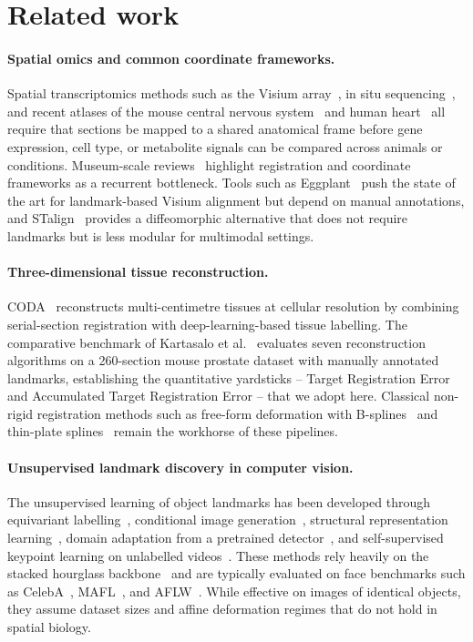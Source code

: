 \section{Related work}

\paragraph{Spatial omics and common coordinate frameworks.} Spatial transcriptomics methods such as the Visium array~\cite{stahl2016visualization}, in situ sequencing~\cite{ke2013insitu}, and recent atlases of the mouse central nervous system~\cite{chen2023atlas} and human heart~\cite{asp2019spatiotemporal} all require that sections be mapped to a shared anatomical frame before gene expression, cell type, or metabolite signals can be compared across animals or conditions. Museum-scale reviews~\cite{moses2022museum,marx2021method} highlight registration and coordinate frameworks as a recurrent bottleneck. Tools such as Eggplant~\cite{bergenstrahle2021eggplant} push the state of the art for landmark-based Visium alignment but depend on manual annotations, and STalign~\cite{clifton2023stalign} provides a diffeomorphic alternative that does not require landmarks but is less modular for multimodal settings.

\paragraph{Three-dimensional tissue reconstruction.} CODA~\cite{kiemen2022coda} reconstructs multi-centimetre tissues at cellular resolution by combining serial-section registration with deep-learning-based tissue labelling. The comparative benchmark of Kartasalo et al.~\cite{kartasalo2018comparative} evaluates seven reconstruction algorithms on a 260-section mouse prostate dataset with manually annotated landmarks, establishing the quantitative yardsticks -- Target Registration Error and Accumulated Target Registration Error -- that we adopt here. Classical non-rigid registration methods such as free-form deformation with B-splines~\cite{rueckert1999nonrigid} and thin-plate splines~\cite{bookstein1989principal} remain the workhorse of these pipelines.

\paragraph{Unsupervised landmark discovery in computer vision.} The unsupervised learning of object landmarks has been developed through equivariant labelling~\cite{thewlis2017unsupervised}, conditional image generation~\cite{jakab2018conditional}, structural representation learning~\cite{zhang2018unsupervised}, domain adaptation from a pretrained detector~\cite{sanchez2019object}, and self-supervised keypoint learning on unlabelled videos~\cite{jakab2020selfsupervised}. These methods rely heavily on the stacked hourglass backbone~\cite{newell2016stacked} and are typically evaluated on face benchmarks such as CelebA~\cite{liu2015celeba}, MAFL~\cite{zhang2016learning}, and AFLW~\cite{kostinger2011aflw}. While effective on images of identical objects, they assume dataset sizes and affine deformation regimes that do not hold in spatial biology.

